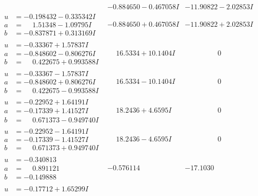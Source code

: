 \documentclass[1p]{elsarticle_modified}
\theoremstyle{definition}
\begin{document}
$$\begin{array}{c|c|c}
 & -0.884650 - 0.467058 I & -11.90822 - 2.02853 I \\ \hline\begin{aligned}
u &= -0.198432 - 0.335342 I \\
a &= \phantom{-}1.51348 - 1.09795 I \\
b &= -0.837871 + 0.313169 I\end{aligned}
 & -0.884650 + 0.467058 I & -11.90822 + 2.02853 I \\ \hline\begin{aligned}
u &= -0.33367 + 1.57837 I \\
a &= -0.848602 - 0.806276 I \\
b &= \phantom{-}0.422675 + 0.993588 I\end{aligned}
 & \phantom{-}16.5334 + 10.1404 I & \phantom{-0.000000 } 0 \\ \hline\begin{aligned}
u &= -0.33367 - 1.57837 I \\
a &= -0.848602 + 0.806276 I \\
b &= \phantom{-}0.422675 - 0.993588 I\end{aligned}
 & \phantom{-}16.5334 - 10.1404 I & \phantom{-0.000000 } 0 \\ \hline\begin{aligned}
u &= -0.22952 + 1.64191 I \\
a &= -0.17339 + 1.41527 I \\
b &= \phantom{-}0.671373 - 0.949740 I\end{aligned}
 & \phantom{-}18.2436 + 4.6595 I & \phantom{-0.000000 } 0 \\ \hline\begin{aligned}
u &= -0.22952 - 1.64191 I \\
a &= -0.17339 - 1.41527 I \\
b &= \phantom{-}0.671373 + 0.949740 I\end{aligned}
 & \phantom{-}18.2436 - 4.6595 I & \phantom{-0.000000 } 0 \\ \hline\begin{aligned}
u &= -0.340813\phantom{ +0.000000I} \\
a &= \phantom{-}0.891121\phantom{ +0.000000I} \\
b &= -0.149888\phantom{ +0.000000I}\end{aligned}
 & -0.576114\phantom{ +0.000000I} & -17.1030\phantom{ +0.000000I} \\ \hline\begin{aligned}
u &= -0.17712 + 1.65299 I \\

\end{aligned}
\end{array}$$
\end{document}
